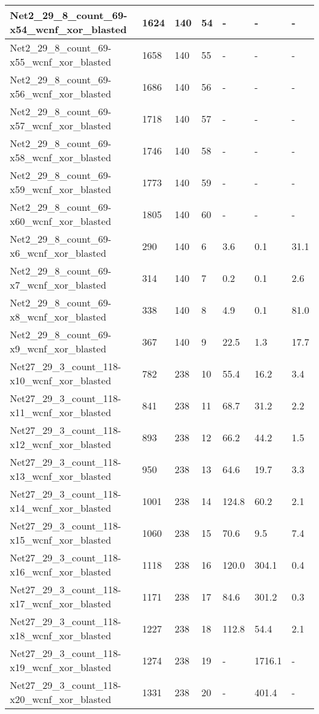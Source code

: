 \begin{scriptsize}
\begin{longtable}{|p{5cm}|l|l|l|l|l|l|}
Net2\_29\_8\_count\_69-x54\_wcnf\_xor\_blasted&1624&140&54&-&-&- \\ \hline 
Net2\_29\_8\_count\_69-x55\_wcnf\_xor\_blasted&1658&140&55&-&-&- \\ \hline 
Net2\_29\_8\_count\_69-x56\_wcnf\_xor\_blasted&1686&140&56&-&-&- \\ \hline 
Net2\_29\_8\_count\_69-x57\_wcnf\_xor\_blasted&1718&140&57&-&-&- \\ \hline 
Net2\_29\_8\_count\_69-x58\_wcnf\_xor\_blasted&1746&140&58&-&-&- \\ \hline 
Net2\_29\_8\_count\_69-x59\_wcnf\_xor\_blasted&1773&140&59&-&-&- \\ \hline 
Net2\_29\_8\_count\_69-x60\_wcnf\_xor\_blasted&1805&140&60&-&-&- \\ \hline 
Net2\_29\_8\_count\_69-x6\_wcnf\_xor\_blasted&290&140&6&3.6&0.1&31.1 \\ \hline 
Net2\_29\_8\_count\_69-x7\_wcnf\_xor\_blasted&314&140&7&0.2&0.1&2.6 \\ \hline 
Net2\_29\_8\_count\_69-x8\_wcnf\_xor\_blasted&338&140&8&4.9&0.1&81.0 \\ \hline 
Net2\_29\_8\_count\_69-x9\_wcnf\_xor\_blasted&367&140&9&22.5&1.3&17.7 \\ \hline 
Net27\_29\_3\_count\_118-x10\_wcnf\_xor\_blasted&782&238&10&55.4&16.2&3.4 \\ \hline 
Net27\_29\_3\_count\_118-x11\_wcnf\_xor\_blasted&841&238&11&68.7&31.2&2.2 \\ \hline 
Net27\_29\_3\_count\_118-x12\_wcnf\_xor\_blasted&893&238&12&66.2&44.2&1.5 \\ \hline 
Net27\_29\_3\_count\_118-x13\_wcnf\_xor\_blasted&950&238&13&64.6&19.7&3.3 \\ \hline 
Net27\_29\_3\_count\_118-x14\_wcnf\_xor\_blasted&1001&238&14&124.8&60.2&2.1 \\ \hline 
Net27\_29\_3\_count\_118-x15\_wcnf\_xor\_blasted&1060&238&15&70.6&9.5&7.4 \\ \hline 
Net27\_29\_3\_count\_118-x16\_wcnf\_xor\_blasted&1118&238&16&120.0&304.1&0.4 \\ \hline 
Net27\_29\_3\_count\_118-x17\_wcnf\_xor\_blasted&1171&238&17&84.6&301.2&0.3 \\ \hline 
Net27\_29\_3\_count\_118-x18\_wcnf\_xor\_blasted&1227&238&18&112.8&54.4&2.1 \\ \hline 
Net27\_29\_3\_count\_118-x19\_wcnf\_xor\_blasted&1274&238&19&-&1716.1&- \\ \hline 
Net27\_29\_3\_count\_118-x20\_wcnf\_xor\_blasted&1331&238&20&-&401.4&- \\ \hline 

\end{longtable}
\end{scriptsize}
